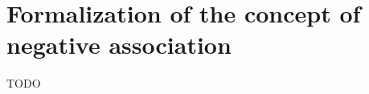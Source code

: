\section{Formalization of the concept of negative association}\label{sec:formalization_neg_dep}
TODO


